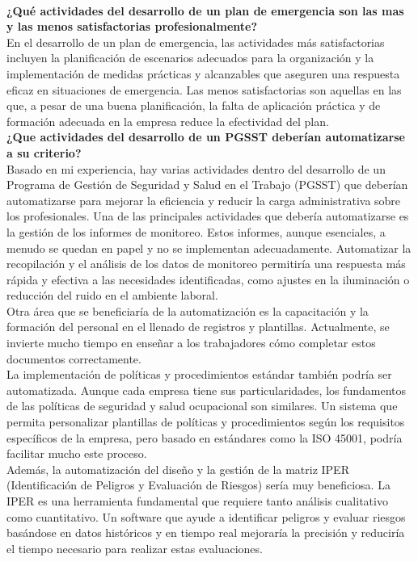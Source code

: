 \\
\noindent
\textbf{¿Qué actividades del desarrollo de un plan de emergencia son las mas y las menos satisfactorias profesionalmente?}\\
En el desarrollo de un plan de emergencia, las actividades más satisfactorias incluyen la planificación de escenarios adecuados para la organización y la implementación de medidas prácticas y alcanzables que aseguren una respuesta eficaz en situaciones de emergencia. Las menos satisfactorias son aquellas en las que, a pesar de una buena planificación, la falta de aplicación práctica y de formación adecuada en la empresa reduce la efectividad del plan.
\\
\noindent
\textbf{¿Que actividades del desarrollo de un PGSST deberían automatizarse a su criterio?}\\
Basado en mi experiencia, hay varias actividades dentro del desarrollo de un Programa de Gestión de Seguridad y Salud en el Trabajo (PGSST) que deberían automatizarse para mejorar la eficiencia y reducir la carga administrativa sobre los profesionales. Una de las principales actividades que debería automatizarse es la gestión de los informes de monitoreo. Estos informes, aunque esenciales, a menudo se quedan en papel y no se implementan adecuadamente. Automatizar la recopilación y el análisis de los datos de monitoreo permitiría una respuesta más rápida y efectiva a las necesidades identificadas, como ajustes en la iluminación o reducción del ruido en el ambiente laboral.\\
Otra área que se beneficiaría de la automatización es la capacitación y la formación del personal en el llenado de registros y plantillas. Actualmente, se invierte mucho tiempo en enseñar a los trabajadores cómo completar estos documentos correctamente.\\
La implementación de políticas y procedimientos estándar también podría ser automatizada. Aunque cada empresa tiene sus particularidades, los fundamentos de las políticas de seguridad y salud ocupacional son similares. Un sistema que permita personalizar plantillas de políticas y procedimientos según los requisitos específicos de la empresa, pero basado en estándares como la ISO 45001, podría facilitar mucho este proceso.\\
Además, la automatización del diseño y la gestión de la matriz IPER (Identificación de Peligros y Evaluación de Riesgos) sería muy beneficiosa. La IPER es una herramienta fundamental que requiere tanto análisis cualitativo como cuantitativo. Un software que ayude a identificar peligros y evaluar riesgos basándose en datos históricos y en tiempo real mejoraría la precisión y reduciría el tiempo necesario para realizar estas evaluaciones.

